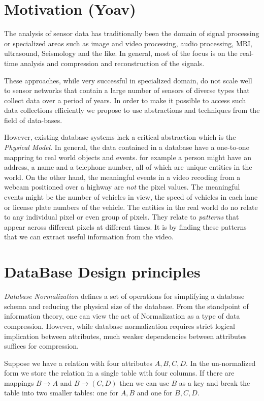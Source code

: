 \section{Motivation (Yoav)}
The analysis of sensor data has traditionally been the domain of
signal processing or specialized areas such as image and video
processing, audio processing, MRI, ultrasound, Seismology and the
like. In general, most of the focus is on the real-time analysis and
compression and reconstruction of the signals.

These approaches, while very successful in specialized domain, do not
scale well to sensor networks that contain a large number of sensors
of diverse types that collect data over a period of years. In order to
make it possible to access such data collections efficiently we
propose to use abstractions and techniques from the field of
data-bases.

However, existing database systems lack a critical abstraction which
is the {\em Physical Model}. In general, the data contained in a
database have a one-to-one mappring to real world objects and events.
for example a person might have an address, a name and a telephone
number, all of which are unique entities in the world. On the other
hand, the meaningful events in a video recoding from a webcam
positioned over a highway are {\em not} the pixel values. The
meaningful events might be the number of vehicles in view, the speed
of vehicles in each lane or license plate numbers of the vehicle.
The entities in the real world do no relate to any individual pixel or
even group of pixels. They relate to {\em patterns} that appear across
different pixels at different times. It is by finding these patterns
that we can extract useful information from the video.

\section{DataBase Design principles}

{\em Database Normalization} defines a set of operations for
simplifying a database schema and reducing the physical size of the
database. From the standpoint of information theory, one can view the
act of Normalization as a type of data compression. However, while
database normalization requires strict logical implication between
attributes, much weaker dependencies between attributes suffices for
compression.

Suppose we have a relation with four attributes $A,B,C,D$. In the
un-normalized form we store the relation in a single table with four
columns. If there are mappings $B \to A$ and $B \to (C,D)$ then we can
use $B$ as a key and break the table into two smaller tables: one for
$A,B$ and one for $B,C,D$. 

